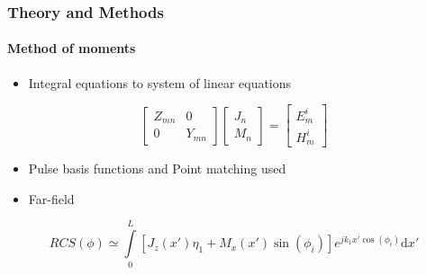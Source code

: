 \documentclass[mathserif,16pt,xcolor=table]{beamer}
\begin{document}
\begin{frame}
  \frametitle{Theory and Methods}
  \framesubtitle{Method of moments}
  \begin{itemize}
    \item {Integral equations to system of linear equations}
  \end{itemize}
  \[
  \begin{bmatrix}
    Z_{mn}   & 0 \\
    0        & Y_{mn}
  \end{bmatrix}
  \begin{bmatrix}
    J_n \\
    M_n
  \end{bmatrix}
  =
  \begin{bmatrix}
    E_m^i \\
    H_m^i
  \end{bmatrix}
  \]
  \begin{itemize}
    \item {Pulse basis functions and Point matching used}
    \item {Far-field}
  \end{itemize}
  \begin{equation} \nonumber
    RCS({\phi}) \simeq \int \limits_{0}^{L} \left[J_z(x')\eta_1 + M_x(x')\sin(\phi_i)\right] e^{j k_1 x' \cos(\phi_i)} \mathrm{d}x'
    \label{eq:far-field}
  \end{equation}
\end{frame}
\end{document}
